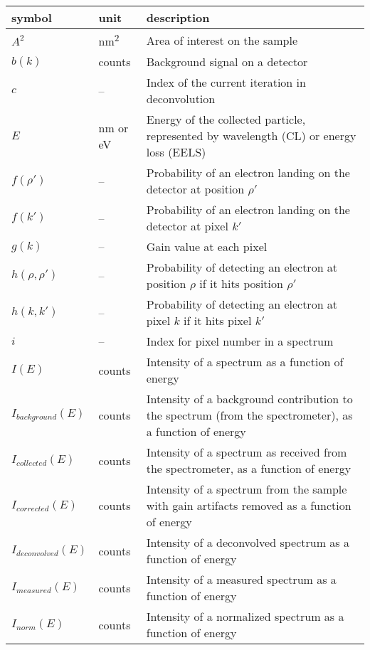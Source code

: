 \renewcommand{\arraystretch}{1.2}
\noindent 
\begin{longtable*}{l l p{11cm}} 
    \toprule
    \textbf{symbol} & \textbf{unit} & \textbf{description}\\
    \midrule 
    $A^2$ & \si{\nano\metre^2} & Area of interest on the sample\\
    $b(k)$ & counts & Background signal on a detector\\
    $c$ & -- & Index of the current iteration in deconvolution \\
    $E$ & \si{\nano\metre} or \si{\electronvolt} & Energy of the collected particle,
    represented by wavelength (CL) or energy loss (EELS)\\
    $f(\rho')$ & -- & Probability of an electron landing on the detector at position
    $\rho'$\\
    $f(k')$ & -- & Probability of an electron landing on the detector at pixel
    $k'$\\
    $g(k)$ & -- & Gain value at each pixel\\
    $h(\rho, \rho')$ & -- & Probability of detecting an electron at position $\rho$
    if it hits position $\rho'$\\
    $h(k, k')$ & -- & Probability of detecting an electron at pixel $k$ if it hits
    pixel $k'$\\
    $i$ & -- & Index for pixel number in a spectrum\\
    $I(E)$ & counts & Intensity of a spectrum as a function of energy\\
    $I_{background}(E)$ & counts & Intensity of a background contribution to the
    spectrum (from the spectrometer), as a function of energy\\
    $I_{collected}(E)$ & counts & Intensity of a spectrum as received from the
    spectrometer, as a function of energy\\
    $I_{corrected}(E)$ & counts & Intensity of a spectrum from the sample with gain
    artifacts removed as a function of energy\\
    $I_{deconvolved}(E)$ & counts & Intensity of a deconvolved spectrum as a
    function of energy\\
    $I_{measured}(E)$ & counts & Intensity of a measured spectrum as a function of
    energy\\
    $I_{norm}(E)$ & counts & Intensity of a normalized spectrum as a function of
    energy\\

\end{longtable*}
